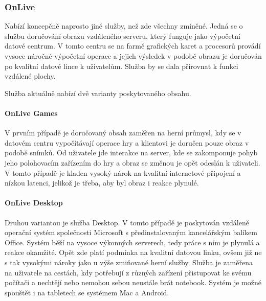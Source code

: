 \subsubsection{OnLive}
\label{sec:onlive}
Nabízí koncepčně naprosto jiné služby, než zde všechny zmíněné. Jedná se o službu doručování obrazu vzdáleného serveru, který funguje jako výpočetní datové centrum. V tomto centru se na farmě grafických karet a procesorů provádí vysoce náročné výpočetní operace a jejich výsledek v podobě obrazu je doručován po kvalitní datové lince k uživatelům. Služba by se dala přirovnat k funkci vzdálené plochy.

Služba aktuálně nabízí dvě varianty poskytovaného obsahu.

\paragraph{OnLive Games}
V prvním případě je doručovaný obsah zaměřen na herní průmysl, kdy se v datovém centru vypočítávají operace hry a klientovi je doručen pouze obraz v podobě snímků.
Od uživatele jde interakce na server, kde se zakomponuje pohyb jeho polohovacím zařízením do hry a obraz se změnou je opět odeslán k uživateli. V tomto případě je kladen vysoký nárok na kvalitní internetové připojení a nízkou latenci, jelikož je třeba, aby byl obraz i reakce plynulé.
\paragraph{OnLive Desktop}
Druhou variantou je služba Desktop. V tomto případě je poskytován vzdáleně operační systém společnosti Microsoft s předinstalovaným kancelářským balíkem Office. Systém běží na vysoce výkonných serverech, tedy práce s ním je plynulá a reakce okamžité. Opět zde platí podmínka na kvalitní datovou linku, ovšem již ne s tak vysokými nároky jako u výše zmiňované herní služby. Služba je zaměřena na uživatele na cestách, kdy potřebují z různých zařízení přistupovat ke svému počítači a nechtějí nebo nemohou sebou neustále brát notebook. Systém je možné spouštět i na tabletech se systémem Mac a Android.

